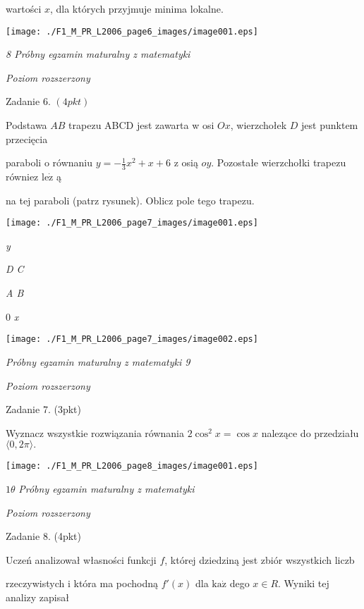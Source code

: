 \documentclass[a4paper,12pt]{article}
\begin{document}
wartości $x$, dla których przyjmuje minima lokalne.
\begin{center}
\texttt{[image: ./F1\_M\_PR\_L2006\_page6\_images/image001.eps]}
\end{center}




{\it 8 Próbny egzamin maturalny z matematyki}

{\it Poziom rozszerzony}

Zadanie 6. $(4pkt)$

Podstawa $AB$ trapezu ABCD jest zawarta w osi $Ox$, wierzchołek $D$ jest punktem przecięcia

paraboli o równaniu $y=-\displaystyle \frac{1}{3}x^{2}+x+6$ z osią $oy$. Pozostałe wierzchołki trapezu równiez $\mathrm{l}\mathrm{e}\dot{\mathrm{z}}$ ą

na tej paraboli (patrz rysunek). Oblicz pole tego trapezu.
\begin{center}
\texttt{[image: ./F1\_M\_PR\_L2006\_page7\_images/image001.eps]}
\end{center}
{\it y}

{\it D C}

{\it A  B}

0  {\it x}
\begin{center}
\texttt{[image: ./F1\_M\_PR\_L2006\_page7\_images/image002.eps]}
\end{center}




{\it Próbny egzamin maturalny z matematyki 9}

{\it Poziom rozszerzony}

Zadanie 7. (3pkt)

Wyznacz wszystkie rozwiązania równania $2\cos^{2}x=\cos x$ nalezące do przedziału $\langle 0,2\pi\rangle.$
\begin{center}
\texttt{[image: ./F1\_M\_PR\_L2006\_page8\_images/image001.eps]}
\end{center}




$ 1\theta$ {\it Próbny egzamin maturalny z matematyki}

{\it Poziom rozszerzony}

Zadanie 8. (4pkt)

Uczeń analizował własności funkcji $f$, której dziedziną jest zbiór wszystkich liczb

rzeczywistych i która ma pochodną $f'(x)$ dla $\mathrm{k}\mathrm{a}\dot{\mathrm{z}}$ dego $x\in R$. Wyniki tej analizy zapisał
\end{document}
